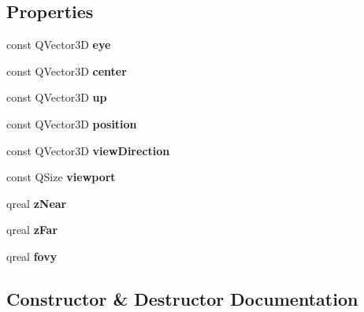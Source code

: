 \subsection*{Properties}
\begin{DoxyCompactItemize}
\item 
\hypertarget{class_camera_aac5808300c4e00d266da238ad35b1a1b}{}const Q\+Vector3\+D {\bfseries eye}\label{class_camera_aac5808300c4e00d266da238ad35b1a1b}

\item 
\hypertarget{class_camera_aacb30cc51aef5e3f98db5b51e3a4ef3b}{}const Q\+Vector3\+D {\bfseries center}\label{class_camera_aacb30cc51aef5e3f98db5b51e3a4ef3b}

\item 
\hypertarget{class_camera_a86995a93a125a9d9941f10144c4c398e}{}const Q\+Vector3\+D {\bfseries up}\label{class_camera_a86995a93a125a9d9941f10144c4c398e}

\item 
\hypertarget{class_camera_a1e8c173f6a47c5ebea0e91aefea50b51}{}const Q\+Vector3\+D {\bfseries position}\label{class_camera_a1e8c173f6a47c5ebea0e91aefea50b51}

\item 
\hypertarget{class_camera_a7745654f918533ddc5e285bcf630e934}{}const Q\+Vector3\+D {\bfseries view\+Direction}\label{class_camera_a7745654f918533ddc5e285bcf630e934}

\item 
\hypertarget{class_camera_a56b601feb6a54eee0bce1910cdeac291}{}const Q\+Size {\bfseries viewport}\label{class_camera_a56b601feb6a54eee0bce1910cdeac291}

\item 
\hypertarget{class_camera_a1db2166635ff27594eda3a23130b66ac}{}qreal {\bfseries z\+Near}\label{class_camera_a1db2166635ff27594eda3a23130b66ac}

\item 
\hypertarget{class_camera_a6290469f972a5903c805725db563f41f}{}qreal {\bfseries z\+Far}\label{class_camera_a6290469f972a5903c805725db563f41f}

\item 
\hypertarget{class_camera_a6cba4066109137fb0d23ee207205927c}{}qreal {\bfseries fovy}\label{class_camera_a6cba4066109137fb0d23ee207205927c}

\end{DoxyCompactItemize}


\subsection{Constructor \& Destructor Documentation}
\hypertarget{class_camera_a33ad49c0e2c636d279be20bacc0d1757}{}
